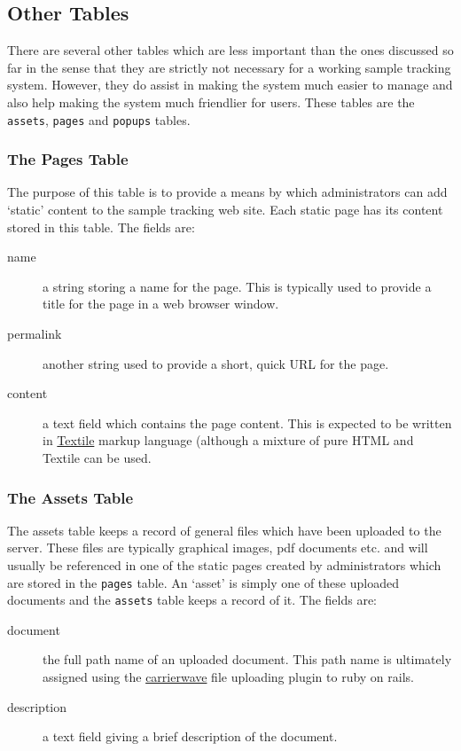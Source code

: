\documentclass[12pt]{article}
\begin{document}
\subsection{Other Tables}
There are several other tables which are less important than the ones 
discussed so far in the sense that they are strictly not necessary for
a working sample tracking system. However, they do assist in making the
system much easier to manage and also help making the system much
friendlier for users. These tables are the \verb=assets=, \verb=pages=
and \verb=popups= tables.

\subsubsection{The Pages Table}
The purpose of this table is to provide a means by which administrators can
add `static' content to the sample tracking web site. Each static page has
its content stored in this table. The fields are:

\begin{description}
\item[name]
a string storing a name for the page. This is typically used to provide
a title for the page in a web browser window.
\item[permalink]
another string used to provide a short, quick URL for the page.
\item[content]
a text field which contains the page content. This is expected to be written
in  \href{http://en.wikipedia.org/wiki/Textile_%28markup_language%29}{Textile}
markup language (although a mixture of pure HTML and Textile can be used.
\end{description}

\subsubsection{The Assets Table}
The assets table keeps a record of general files which have been uploaded
to the server. These files are typically graphical images, pdf documents etc.
and will usually be referenced in one of the static pages created by
administrators which are stored in the \verb=pages= table. An `asset' is
simply one of these uploaded documents and the \verb=assets= table keeps
a record of it. The fields are:

\begin{description}
\item[document]
the full path name of an uploaded document. This path name is ultimately
assigned using the 
\href{https://github.com/jnicklas/carrierwave}{carrierwave}
file uploading plugin to ruby on rails.
\item[description]
a text field giving a brief description of the document.
\end{description}
\end{document}
